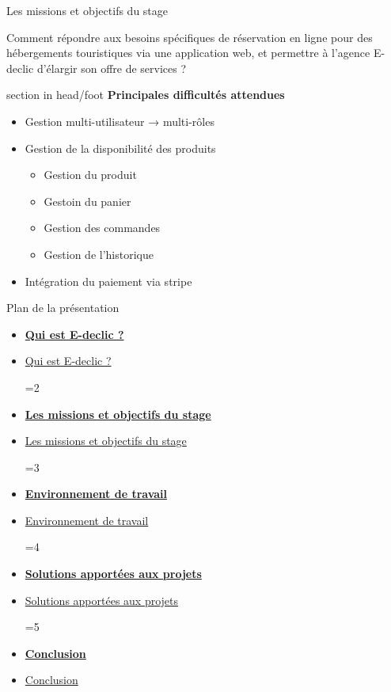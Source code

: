 \documentclass{beamer}
\newcommand{\planLine}[4]{
  \ifnum#1=#2
    \item \hyperlink{#3}{\textbf{\large #4}}
  \else
    \item \hyperlink{#3}{#4}
  \fi
}
\newcommand{\planSlide}[1]{
  	\begin{frame}{Plan de la présentation}
  		\begin{center}
  			\begin{minipage}{1\textwidth}
				\begin{itemize}
      			\planLine{#1}{1}{organisation}{Qui est E-declic ?}
      			\planLine{#1}{2}{sujet}{Les missions et objectifs du stage}
      			\planLine{#1}{3}{environnement}{Environnement de travail}
      			\planLine{#1}{4}{realisation}{Solutions apportées aux projets}
      			\planLine{#1}{5}{conclusion}{Conclusion}
	    		\end{itemize}
  		\end{minipage}
	\end{center}
	\vfill
	\end{frame}
}
\begin{document}
\begin{frame}{Les missions et objectifs du stage}

	Comment répondre aux besoins spécifiques de réservation en ligne pour des hébergements touristiques via une application web, et permettre à l’agence E-declic d’élargir son offre de services ?
			
	\begin{center}
  		\begin{minipage}{0.9\textwidth}
			\begin{beamercolorbox}[wd=\paperwidth,ht=1.5em,dp=0.5em,leftskip=0.5cm]{section in head/foot}
  				\large \textbf{Principales difficultés attendues}
			\end{beamercolorbox}
			
			\begin{itemize}
				\item Gestion multi-utilisateur → multi-rôles
				\item Gestion de la disponibilité des produits
				\begin{itemize}
					\item Gestion du produit
					\item Gestoin du panier
					\item Gestion des commandes
					\item Gestion de l'historique
				\end{itemize}
				\item Intégration du paiement via stripe
			\end{itemize}
  			\vspace{1cm}
  		\end{minipage}
	\end{center}
	\vfill
\end{frame}

\planSlide{3}
\end{document}
